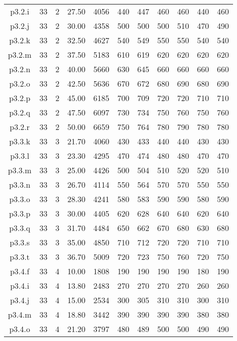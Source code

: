 \begin{center}
\begin{tabular}{ |c|c|c|c|c|c|c|c|c|c|c| }
p3.2.i & 33 & 2 & 27.50 & 4056 & 440 & 447 & 460 & 460 & 440 & 460  \\
p3.2.j & 33 & 2 & 30.00 & 4358 & 500 & 500 & 500 & 510 & 470 & 490  \\
p3.2.k & 33 & 2 & 32.50 & 4627 & 540 & 549 & 550 & 550 & 540 & 540  \\
p3.2.m & 33 & 2 & 37.50 & 5183 & 610 & 619 & 620 & 620 & 620 & 620  \\
p3.2.n & 33 & 2 & 40.00 & 5660 & 630 & 645 & 660 & 660 & 660 & 660  \\
p3.2.o & 33 & 2 & 42.50 & 5636 & 670 & 672 & 680 & 690 & 680 & 690  \\
p3.2.p & 33 & 2 & 45.00 & 6185 & 700 & 709 & 720 & 720 & 710 & 710  \\
p3.2.q & 33 & 2 & 47.50 & 6097 & 730 & 734 & 750 & 760 & 750 & 760  \\
p3.2.r & 33 & 2 & 50.00 & 6659 & 750 & 764 & 780 & 790 & 780 & 780  \\
p3.3.k & 33 & 3 & 21.70 & 4060 & 430 & 433 & 440 & 440 & 430 & 430  \\
p3.3.l & 33 & 3 & 23.30 & 4295 & 470 & 474 & 480 & 480 & 470 & 470  \\
p3.3.m & 33 & 3 & 25.00 & 4426 & 500 & 504 & 510 & 520 & 520 & 510  \\
p3.3.n & 33 & 3 & 26.70 & 4114 & 550 & 564 & 570 & 570 & 550 & 550  \\
p3.3.o & 33 & 3 & 28.30 & 4241 & 580 & 583 & 590 & 590 & 580 & 590  \\
p3.3.p & 33 & 3 & 30.00 & 4405 & 620 & 628 & 640 & 640 & 620 & 640  \\
p3.3.q & 33 & 3 & 31.70 & 4484 & 650 & 662 & 670 & 680 & 630 & 680  \\
p3.3.s & 33 & 3 & 35.00 & 4850 & 710 & 712 & 720 & 720 & 710 & 710  \\
p3.3.t & 33 & 3 & 36.70 & 5009 & 720 & 723 & 750 & 760 & 720 & 750  \\
p3.4.f & 33 & 4 & 10.00 & 1808 & 190 & 190 & 190 & 190 & 180 & 190  \\
p3.4.i & 33 & 4 & 13.80 & 2483 & 270 & 270 & 270 & 270 & 260 & 260  \\
p3.4.j & 33 & 4 & 15.00 & 2534 & 300 & 305 & 310 & 310 & 300 & 310  \\
p3.4.m & 33 & 4 & 18.80 & 3442 & 390 & 390 & 390 & 390 & 380 & 380  \\
p3.4.o & 33 & 4 & 21.20 & 3797 & 480 & 489 & 500 & 500 & 490 & 490  \\
\hline
\end{tabular}
\end{center}

